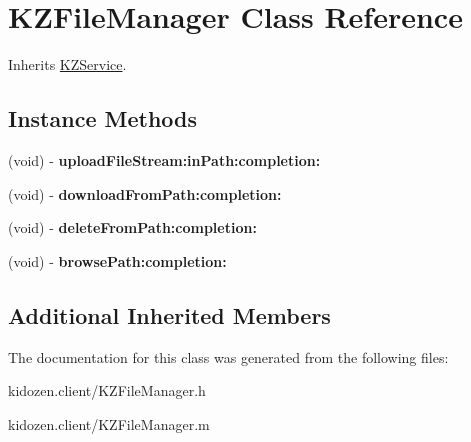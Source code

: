 \hypertarget{interface_k_z_file_manager}{\section{K\-Z\-File\-Manager Class Reference}
\label{interface_k_z_file_manager}
}


Inherits \hyperlink{interface_k_z_service}{K\-Z\-Service}.

\subsection*{Instance Methods}
\begin{DoxyCompactItemize}
\item 
\hypertarget{interface_k_z_file_manager_af7d94d52201cbd213a720dd5848bff9e}{(void) -\/ {\bfseries upload\-File\-Stream\-:in\-Path\-:completion\-:}}\label{interface_k_z_file_manager_af7d94d52201cbd213a720dd5848bff9e}

\item 
\hypertarget{interface_k_z_file_manager_a5bf134a1089626a770ec31e41a90049a}{(void) -\/ {\bfseries download\-From\-Path\-:completion\-:}}\label{interface_k_z_file_manager_a5bf134a1089626a770ec31e41a90049a}

\item 
\hypertarget{interface_k_z_file_manager_a367e94c1c89f0f2e0feb25bac0036c76}{(void) -\/ {\bfseries delete\-From\-Path\-:completion\-:}}\label{interface_k_z_file_manager_a367e94c1c89f0f2e0feb25bac0036c76}

\item 
\hypertarget{interface_k_z_file_manager_a99a11d17482d4dc4ff34cb4233927e63}{(void) -\/ {\bfseries browse\-Path\-:completion\-:}}\label{interface_k_z_file_manager_a99a11d17482d4dc4ff34cb4233927e63}

\end{DoxyCompactItemize}
\subsection*{Additional Inherited Members}


The documentation for this class was generated from the following files\-:\begin{DoxyCompactItemize}
\item 
kidozen.\-client/K\-Z\-File\-Manager.\-h\item 
kidozen.\-client/K\-Z\-File\-Manager.\-m\end{DoxyCompactItemize}
